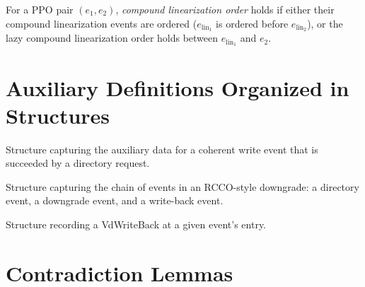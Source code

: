 \begin{definition}
  \label{def:CompoundLinearizationOrder}
  \leanok
  For a PPO pair $(e_1, e_2)$, \emph{compound linearization order} holds if
  either their compound linearization events are ordered
  ($e_{\mathrm{lin}_1}$ is ordered before $e_{\mathrm{lin}_2}$),
  or the lazy compound linearization order holds between $e_{\mathrm{lin}_1}$ and $e_2$.
\end{definition}

\section{Auxiliary Definitions Organized in Structures}
\label{sec:some-auxiliary-defs}

\begin{definition}
  \label{def:coherentWriteSucceededByDirectoryRequest}
  \leanok
  Structure capturing the auxiliary data for a coherent write event
  that is succeeded by a directory request.
\end{definition}

\begin{definition}
  \label{def:rccOStyleDowngrade}
  \leanok
  Structure capturing the chain of events in an RCCO-style downgrade:
  a directory event, a downgrade event, and a write-back event.
\end{definition}

\begin{definition}
  \label{def:writeBackAtEvent}
  \leanok
  Structure recording a VdWriteBack at a given event's entry.
\end{definition}

\section{Contradiction Lemmas}
\label{sec:contradiction-of-nonsense-cases}

